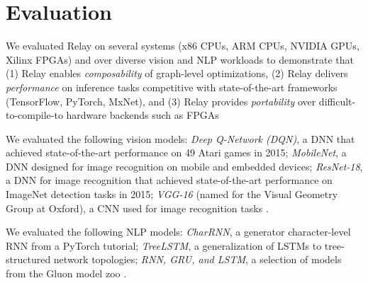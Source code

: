 \section{Evaluation}
\label{sec:eval}

We evaluated Relay on several systems (x86 CPUs, ARM CPUs, NVIDIA GPUs, Xilinx FPGAs) and over
  diverse vision and NLP workloads to demonstrate that (1) Relay enables \emph{composability} of
  graph-level optimizations, (2) Relay delivers \emph{performance} on inference tasks competitive
  with state-of-the-art frameworks (TensorFlow, PyTorch, MxNet), and (3) Relay provides
  \emph{portability} over difficult-to-compile-to hardware backends such as FPGAs

We evaluated the following vision models:
  \textit{Deep Q-Network (DQN)}, a DNN that achieved state-of-the-art performance
  on 49 Atari games in 2015;
  \textit{MobileNet}, a DNN designed for image recognition on mobile and
  embedded devices;
  \textit{ResNet-18}, a DNN for image recognition that achieved state-of-the-art
  performance on ImageNet detection tasks in 2015;
  \textit{VGG-16} (named for the Visual Geometry Group
  at Oxford), a CNN used for image recognition tasks
  \citep{dqn, mobilenet, resnet, vgg}.

We evaluated the following NLP models:
  \textit{CharRNN}, a generator character-level
  RNN from a PyTorch tutorial;
  \textit{TreeLSTM}, a generalization of LSTMs to
  tree-structured network topologies;
  \textit{RNN, GRU, and LSTM}, a selection of models from the Gluon
  model zoo
  \citep{pytorch_rnn_tut, tree_lstm, gluon_model_zoo}.

